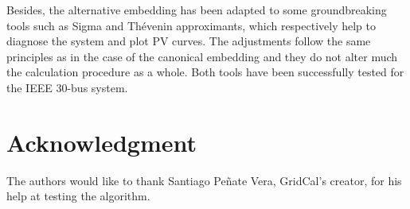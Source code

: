 \documentclass[journal]{IEEEtran}
\begin{document}
Besides, the alternative embedding has been adapted to some groundbreaking tools such as Sigma and Thévenin approximants, which respectively help to diagnose the system and plot PV curves. The adjustments follow the same principles as in the case of the canonical embedding and they do not alter much the calculation procedure as a whole. Both tools have been successfully tested for the IEEE 30-bus system.







%





\section*{Acknowledgment}
The authors would like to thank Santiago Peñate Vera, GridCal's creator, for his help at testing the algorithm.
\end{document}
